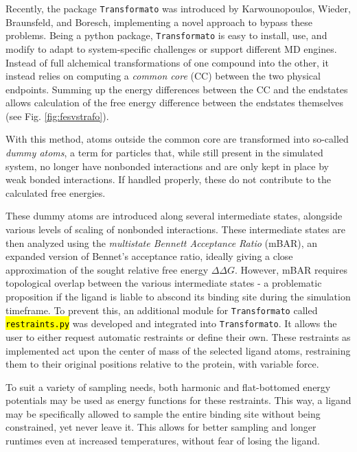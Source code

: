 \documentclass[oneside]{scrreprt}
\newcommand{\code}[1]{\texttt{\hl{#1}}}
\begin{document}
Recently, the package \texttt{Transformato} was introduced by Karwounopoulos, Wieder, Braunsfeld, and Boresch\cite{Karwou2022Jun,braunsfeldImplementationTestingCHARMM,Wieder2022Jun}, implementing a novel approach to bypass these problems. Being a python package, \texttt{Transformato} is easy to install, use, and modify to adapt to system-specific challenges or support different MD engines. Instead of full alchemical transformations of one compound into the other, it instead relies on computing a \emph{common core} (CC) between the two physical endpoints. Summing up the energy differences between the CC and the endstates allows calculation of the free energy difference between the endstates themselves (see Fig. \ref{fig:fesvstrafo}).



With this method, atoms outside the common core are transformed into so-called \emph{dummy atoms}, a term for particles that, while still present in the simulated system, no longer have nonbonded interactions and are only kept in place by weak bonded interactions. If handled properly, these do not contribute to the calculated free energies\cite{fleckDummyAtomsAlchemical2021}.

These dummy atoms are introduced along several intermediate states, alongside various levels of scaling of nonbonded interactions. These intermediate states are then analyzed using the \emph{multistate Bennett Acceptance Ratio}\cite{shirts_statistically_2008} (mBAR), an expanded version of Bennet's acceptance ratio\cite{Bennett1976Oct}, ideally giving a close approximation of the sought relative free energy $\Delta\Delta G$. However, mBAR requires topological overlap between the various intermediate states - a problematic proposition if the ligand is liable to abscond its binding site during the simulation timeframe. To prevent this, an additional module for \texttt{Transformato} called \code{restraints.py} was developed and integrated into \texttt{Transformato}. It allows the user to either request automatic restraints or define their own. These restraints as implemented act upon the center of mass of the selected ligand atoms, restraining them to their original positions relative to the protein, with variable force.

To suit a variety of sampling needs, both harmonic and flat-bottomed energy potentials may be used as energy functions for these restraints. This way, a ligand may be specifically allowed to sample the entire binding site without being constrained, yet never leave it. This allows for better sampling and longer runtimes even at increased temperatures, without fear of losing the ligand.
\end{document}
